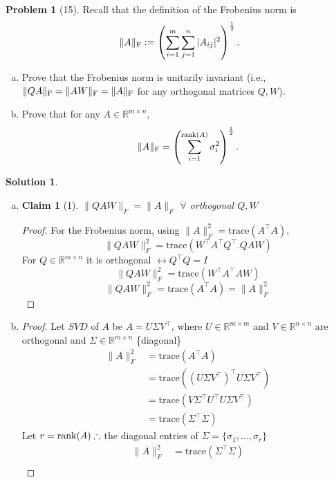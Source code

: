 \documentclass{amsart}[11pt]
\newtheorem*{claim}{Claim}
\theoremstyle{definition}
\newtheorem*{problem}{Problem}
\newtheorem{solution}{Solution}
\newcommand{\R}{\mathbb{R}}
\newcommand{\rank}{\textnormal{rank}}
\newcommand{\fro}{\textnormal{F}}
\begin{document}
\begin{problem}[15]
Recall that the definition of the Frobenius norm is \[\|A\|_{\fro}:=\left(\sum_{i=1}^m\sum_{j=1}^n|A_{ij}|^2\right)^\frac12.\]
\begin{enumerate}[(a)]
\item Prove that the Frobenius norm is unitarily invariant (i.e., $\|QA\|_{\fro} = \|AW\|_{\fro} = \|A\|_{\fro}$ for any orthogonal matrices $Q,W$). \item Prove that for any $A\in\R^{m\times n}$,
 \[\|A\|_{\fro} = \left(\sum_{i=1}^{\rank(A)} \sigma_i^2\right)^\frac12.\]
\end{enumerate}
\begin{solution}
    \begin{enumerate}[(a)]
        \item \begin{claim}[1]
            $\|QAW\|_F=\|A\|_F$ $\forall$ orthogonal $Q,W$
        \end{claim}
        \begin{proof}
            For the Frobenius norm, using $\|A\|_F^{2} = \mathrm{trace}(A^\top A),$
            \[\|QAW\|_F^{2}=\mathrm{trace}(W^\top A^\top Q^\top.QAW)\] For $Q\in\R^{m\times n}$ it is orthogonal $\leftrightarrow Q^\top Q = I$
            \[\|QAW\|_F^{2}=\mathrm{trace}(W^\top A^\top AW)\]
            \[\|QAW\|_F^{2}=\mathrm{trace}( A^\top A) = \|A\|_F^{2}\]
        \end{proof} 
        \vspace{\baselineskip}
        \item \begin{proof}
            Let $SVD$ of $A$ be $A=U\Sigma V^\top$, where $U\in\R^{m\times m}$ and $V\in\R^{n\times n}$ are orthogonal and $\Sigma \in\R^{m\times n}$ \{diagonal\}
            \begin{align*}
            \|A\|_F^2&=\mathrm{trace}(A^\top A) \\
            &=\mathrm{trace}((U\Sigma V^\top)^\top U\Sigma V^\top) \\
            &= \mathrm{trace}(V\Sigma^\top U^\top U\Sigma V^\top) \\
            &= \mathrm{trace}(\Sigma^\top \Sigma)
            \end{align*}
            Let $r = \rank(A) \therefore$ the diagonal entries of $\Sigma = \{\sigma_1,\dots,\sigma_r\}$
            \begin{align*}
    \|A\|_F^2 &= \mathrm{trace}(\Sigma^\top \Sigma) \\
            \end{align*}
        \end{proof}
    \end{enumerate}
\end{solution}
\end{problem}
\end{document}
